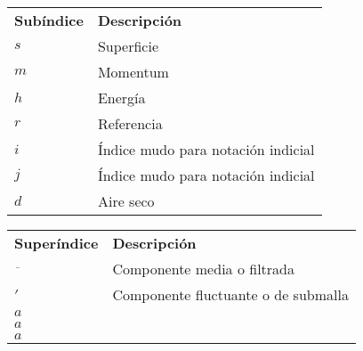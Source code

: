 \newpage
\begin{tabular}{ll}
	\textbf{Subíndice} & \textbf{Descripción}\\
	$s$ & Superficie    \\
	$m$ & Momentum  	\\
	$h$ & Energía     \\
	$r$ & Referencia     \\
	$i$ & Índice mudo para notación indicial     \\
	$j$ & Índice mudo para notación indicial     \\
	$d$ & Aire seco \\
\end{tabular}

\begin{tabular}{ll}
	\textbf{Superíndice} & \textbf{Descripción}\\
	$\overline{\,\,\,}$ & Componente media o filtrada      \\
	$'$ & Componente fluctuante o de submalla  	\\
	$a$ &      \\
	$a$ &      \\
	$a$ &      \\
\end{tabular}